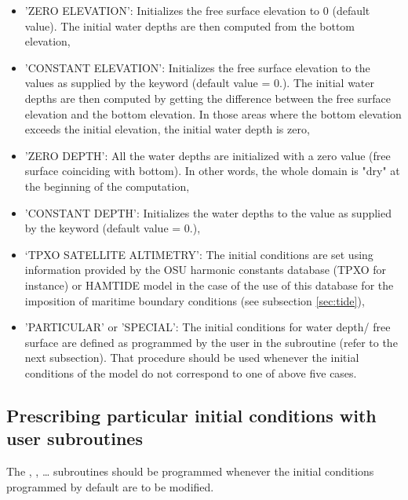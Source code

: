 \begin{itemize}
\item 'ZERO ELEVATION': Initializes the free surface elevation
to 0 (default value). The initial water depths are then computed from the
bottom elevation,

\item 'CONSTANT ELEVATION': Initializes the free surface elevation to the
values as supplied by the keyword 
(default value = 0.). The initial water
depths are then computed by getting the difference between the free surface
elevation and the bottom elevation.
In those areas where the bottom elevation exceeds
the initial elevation, the initial water depth is zero,

\item 'ZERO DEPTH': All the water depths are initialized with a zero value
(free surface coinciding with bottom). In other words, the whole domain is
"dry" at the beginning of the computation,

\item 'CONSTANT DEPTH': Initializes the water depths to the value as supplied
by the keyword  (default value = 0.),

\item `TPXO SATELLITE ALTIMETRY': The initial conditions are set using
information provided by the OSU harmonic constants database (TPXO for instance)
or HAMTIDE model
in the case of the use of this database for the imposition of maritime boundary
conditions (see subsection \ref{sec:tide}),

\item 'PARTICULAR' or 'SPECIAL': The initial conditions for water depth/
free surface are defined as programmed by the user
in the  subroutine (refer to the next
subsection).
That procedure should be used whenever the initial conditions of the model do
not correspond to one of above five cases.
\end{itemize}


\subsection{Prescribing particular initial conditions with user subroutines}
\label{sec:prescr_IC}

The , ,
\ldots
subroutines should be programmed whenever the initial
conditions programmed by default are to be modified.

